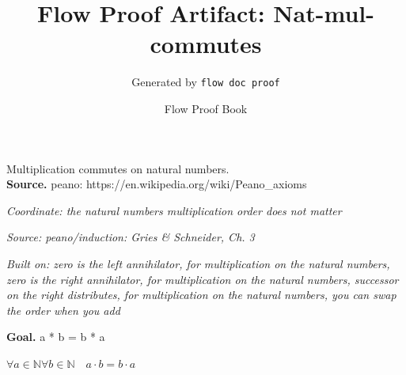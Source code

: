 \documentclass[11pt]{article}
\title{Flow Proof Artifact: Nat-mul-commutes}
\author{Generated by \texttt{flow doc proof}}
\date{Flow Proof Book}
\theoremstyle{definition}
\begin{document}
\maketitle
Multiplication commutes on natural numbers.\\[0.5em]
\textbf{Source.} peano: https://en.wikipedia.org/wiki/Peano\_axioms\\[0.5em]
\bigskip
{}\par
\smallskip\noindent\textit{Coordinate: the natural numbers \cdot multiplication \cdot order does not matter}\par
\smallskip\noindent\textit{Source: peano/induction: Gries \& Schneider, Ch. 3}\par
\smallskip\noindent\textit{Built on: zero is the left annihilator, for multiplication on the natural numbers, zero is the right annihilator, for multiplication on the natural numbers, successor on the right distributes, for multiplication on the natural numbers, you can swap the order when you add}\par
\medskip
\noindent\textbf{Goal.} a * b = b * a\par
\noindent$\displaystyle \forall a \in \mathbb{N} \forall b \in \mathbb{N}\quad a \cdot b = b \cdot a$\par
\medskip
\noindent
\end{document}
